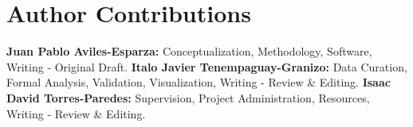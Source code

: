 \documentclass[10pt]{article}
\begin{document}
\section*{Author Contributions}
\textbf{Juan Pablo Aviles-Esparza:} Conceptualization, Methodology, Software, Writing - Original Draft. \textbf{Italo Javier Tenempaguay-Granizo:} Data Curation, Formal Analysis, Validation, Visualization, Writing - Review \& Editing. \textbf{Isaac David Torres-Paredes:} Supervision, Project Administration, Resources, Writing - Review \& Editing.



\end{document}
